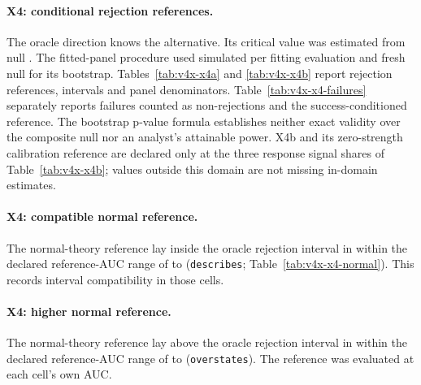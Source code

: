 \paragraph{X4: conditional rejection references.}
The oracle direction knows the alternative.
Its critical value was estimated from  null . The fitted-panel procedure used  simulated  per fitting evaluation and  fresh null  for its bootstrap.
Tables~\ref{tab:v4x-x4a} and \ref{tab:v4x-x4b} report rejection references, intervals and panel denominators. Table~\ref{tab:v4x-x4-failures} separately reports failures counted as non-rejections and the success-conditioned reference.
The bootstrap p-value formula establishes neither exact validity over the composite null nor an analyst's attainable power.
X4b and its zero-strength calibration reference are declared only at the three response signal shares of Table~\ref{tab:v4x-x4b}; values outside this domain are not missing in-domain estimates.

\paragraph{X4: compatible normal reference.}
The normal-theory reference lay inside the oracle rejection interval in   within the declared reference-AUC range of  to  (\texttt{describes}; Table~\ref{tab:v4x-x4-normal}).
This records interval compatibility in those cells.

\paragraph{X4: higher normal reference.}
The normal-theory reference lay above the oracle rejection interval in   within the declared reference-AUC range of  to  (\texttt{overstates}).
The reference was evaluated at each cell's own AUC.

